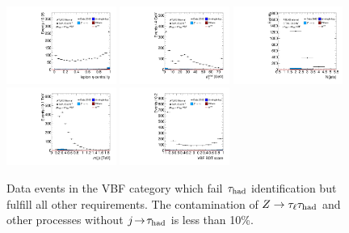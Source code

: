 \begin{figure}[tp]
  \includegraphics[width=0.32\textwidth]{figures/antitaus/lep-eta-centrality}
  \includegraphics[width=0.32\textwidth]{figures/antitaus/system-pt}
  \includegraphics[width=0.32\textwidth]{figures/antitaus/n-jets30}
  \includegraphics[width=0.32\textwidth]{figures/antitaus/dijet-m-veryhigh}
  \includegraphics[width=0.32\textwidth]{figures/antitaus/BDTEve-VBF}
  \caption{Data events in the VBF category which fail $\tau_\text{had}$ identification but fulfill all other requirements. The contamination of $Z\rightarrow\tau_\ell\tau_\text{had}$ and other processes without $j\!\rightarrow\!\tau_\text{had}$ is less than 10\%.}
  \label{fig:backgrounds-antitaus-jets}
\end{figure}

\clearpage

